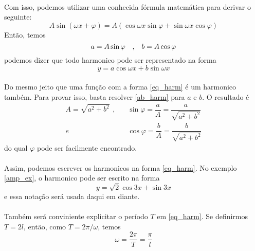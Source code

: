 \documentclass{article}
\begin{document}
\\
Com isso, podemos utilizar uma conhecida fórmula matemática para derivar
o seguinte:\\
\begin{equation}
    A\sin{(\omega x + \varphi)} = A(\cos{\omega x}\sin{\varphi} + \sin{\omega x}\cos{\varphi})
\end{equation}
Então, temos\\
\begin{equation}
\label{ab_harm}
    a = A\sin{\varphi}\text{\hspace{10pt},\hspace{10pt}}b = A\cos{\varphi}
\end{equation}
podemos dizer que todo harmonico pode ser representado na forma
\begin{equation}
\label{eq_harm}
    y = a\cos{\omega x} + b\sin{\omega x}
\end{equation}
\\
Do mesmo jeito que uma função com a forma \ref{eq_harm} é um harmonico também. 
Para provar isso, basta resolver \ref{ab_harm} para $a$ e $b$. O resultado é
\begin{equation}
    \begin{split}
        A = \sqrt{a^2 + b^2}\hspace{5pt},\hspace{10pt} &\sin{\varphi} = \dfrac{a}{A} = \dfrac{a}{\sqrt{a^2 + b^2}}\\
        e\hspace{10pt} & \cos{\varphi} = \dfrac{b}{A} = \dfrac{b}{\sqrt{a^2 + b^2}}
    \end{split}
\end{equation} 
do qual $\varphi$ pode ser facilmente encontrado.\\
\\
Assim, podemos escrever os harmonicos na forma \ref{eq_harm}. No exemplo \ref{amp_ex},
o harmonico pode ser escrito na forma\\
\begin{equation}
    y = \sqrt{2}\cos{3x}+\sin{3x}
\end{equation} 
e essa notação será usada daqui em diante.\\
\\
Também será conviniente explicitar o período $T$ em \ref{eq_harm}. Se definirmos
$T = 2l$, então, como $T = 2\pi/\omega$, temos
\begin{equation}
    \omega = \dfrac{2\pi}{T}=\dfrac{\pi}{l}
\end{equation}
\end{document}
